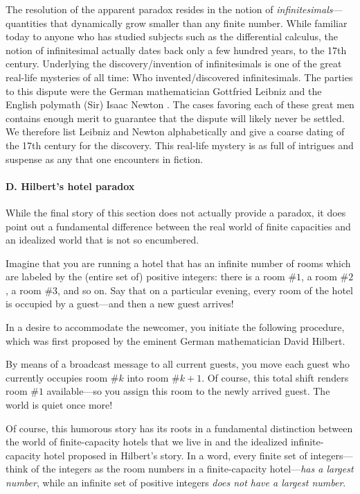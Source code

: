 The resolution of the apparent paradox resides in the notion of
 {\em infinitesimals}---quantities that
dynamically grow smaller than any finite number.  While familiar today
to anyone who has studied subjects such as the differential calculus,
the notion of infinitesimal actually dates back only a few hundred
years, to the 17th century.  Underlying the discovery/invention of
infinitesimals is one of the great real-life mysteries of all time:
Who invented/discovered infinitesimals.  The parties to this dispute
were the German mathematician Gottfried Leibniz \cite{Leibniz}
 and the English polymath
(Sir) Isaac Newton \cite{Newton}.   The cases
favoring each of these great men contains enough merit to guarantee
that the dispute will likely never be settled.  We therefore list
Leibniz and Newton alphabetically and give a coarse dating of the 17th
century for the discovery.  This real-life mystery is as full of
intrigues and suspense as any that one encounters in fiction.


\paragraph{\small\sf D. Hilbert's hotel paradox}

While the final story of this section does not actually provide a
paradox, it does point out a fundamental difference between the real
world of finite capacities and an idealized world that is not so
encumbered.

Imagine that you are running a hotel that has an infinite number of
rooms which are labeled by the (entire set of) positive integers:
there is a room \#$1$, a room \#$2$, a room \#$3$, and so on.  Say
that on a particular evening, every room of the hotel is occupied by a
guest---and then a new guest arrives!

In a desire to accommodate the newcomer, you initiate the following
procedure, which was first proposed by the eminent German
mathematician David Hilbert. 

By means of a broadcast message to all current guests, you move each
guest who currently occupies room \#$k$ into room \#$k+1$.  Of course,
this total shift renders room \#$1$ available---so you assign this
room to the newly arrived guest.  The world is quiet once more!

Of course, this humorous story has its roots in a fundamental
distinction between the world of finite-capacity hotels that we live
in and the idealized infinite-capacity hotel proposed in Hilbert's
story.  In a word, every finite set of integers---think of the
integers as the room numbers in a finite-capacity hotel---{\em has a
  largest number}, while an infinite set of positive integers {\em
  does not have a largest number}.


